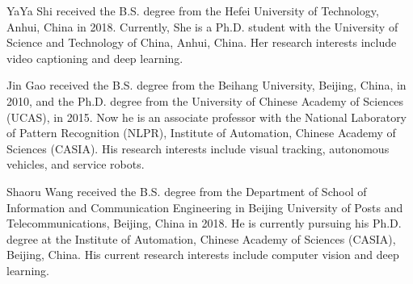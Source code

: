 \documentclass[journal]{IEEEtran}
\begin{document}
\begin{IEEEbiography}
  {YaYa Shi}
  received the B.S. degree from the Hefei University of Technology, Anhui, China in 2018. Currently, She is a Ph.D. student with the University of Science and Technology of China, Anhui, China. Her research interests include video captioning and deep learning.
\end{IEEEbiography}
\vspace{-5mm}

\begin{IEEEbiography}
{Jin Gao}
received the B.S. degree from the Beihang University, Beijing, China, in 2010, and the Ph.D. degree from the University of Chinese Academy of Sciences (UCAS), in 2015. Now he is an associate professor with the National Laboratory of Pattern Recognition (NLPR), Institute of Automation, Chinese Academy of Sciences (CASIA). His research interests include visual tracking, autonomous vehicles, and service robots.
\end{IEEEbiography}
\vspace{-5mm}

\begin{IEEEbiography}
{Shaoru Wang}
received the B.S. degree from the Department of School of Information and Communication Engineering in Beijing University of Posts and Telecommunications, Beijing, China in 2018. He is currently pursuing his Ph.D. degree at the Institute of Automation, Chinese Academy of Sciences (CASIA), Beijing, China. His current research interests include computer vision and deep learning.
\end{IEEEbiography}
\vspace{-5mm}
\end{document}
